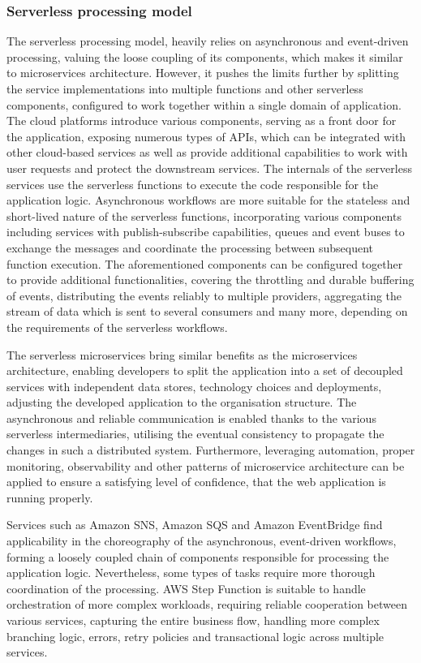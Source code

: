\subsubsection{Serverless processing model}

The serverless processing model, heavily relies on asynchronous and event-driven processing, valuing the loose coupling of its components, which makes it similar to microservices architecture.
However, it pushes the limits further by splitting the service implementations into multiple functions and other serverless components, configured to work together within a single domain of application.
The cloud platforms introduce various components, serving as a front door for the application, exposing numerous types of APIs, which can be integrated with other cloud-based services as well as provide additional capabilities to work with user requests and protect the downstream services.
The internals of the serverless services use the serverless functions to execute the code responsible for the application logic.
Asynchronous workflows are more suitable for the stateless and short-lived nature of the serverless functions, incorporating various components including services with publish-subscribe capabilities, queues and event buses to exchange the messages and coordinate the processing between subsequent function execution.
The aforementioned components can be configured together to provide additional functionalities, covering the throttling and durable buffering of events, distributing the events reliably to multiple providers, aggregating the stream of data which is sent to several consumers and many more, depending on the requirements of the serverless workflows.

The serverless microservices bring similar benefits as the microservices architecture, enabling developers to split the application into a set of decoupled services with independent data stores, technology choices and deployments, adjusting the developed application to the organisation structure.
The asynchronous and reliable communication is enabled thanks to the various serverless intermediaries, utilising the eventual consistency to propagate the changes in such a distributed system.
Furthermore, leveraging automation, proper monitoring, observability and other patterns of microservice architecture can be applied to ensure a satisfying level of confidence, that the web application is running properly.

Services such as Amazon SNS, Amazon SQS and Amazon EventBridge find applicability in the choreography of the asynchronous, event-driven workflows, forming a loosely coupled chain of components responsible for processing the application logic.
Nevertheless, some types of tasks require more thorough coordination of the processing.
AWS Step Function is suitable to handle orchestration of more complex workloads, requiring reliable cooperation between various services, capturing the entire business flow, handling more complex branching logic, errors, retry policies and transactional logic across multiple services.

